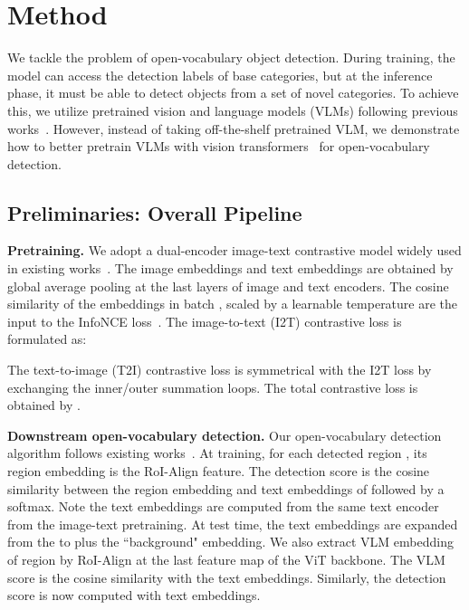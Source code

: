 \documentclass[10pt,twocolumn,letterpaper]{article}
\renewcommand{\paragraph}[1]{\vspace{1mm}\noindent\textbf{#1}}
\begin{document}
\section{Method}
\label{sec:method}

We tackle the problem of open-vocabulary object detection. During training, the model can access the detection labels of base categories, but at the inference phase, it must be able to detect objects from a set of novel categories. To achieve this, we utilize pretrained vision and language models (VLMs) following previous works~\cite{gu2022openvocabulary,zhong2021regionclip,kuo2022f}. However, instead of taking off-the-shelf pretrained VLM, we demonstrate how to better pretrain VLMs with vision transformers~\cite{dosovitskiy2020image} for open-vocabulary detection.

\subsection{Preliminaries: Overall Pipeline} 
\label{sec:preliminaries}
\paragraph{Pretraining.}\quad
We adopt a dual-encoder image-text contrastive model widely used in existing works~\cite{radford2021clip,align}. The image embeddings  and text embeddings  are obtained by global average pooling at the last layers of image and text encoders. The cosine similarity of the embeddings in batch , scaled by a learnable temperature  are the input to the InfoNCE loss~\cite{oord2018representation,radford2021clip}. The image-to-text (I2T) contrastive loss is formulated as:

The text-to-image (T2I) contrastive loss is symmetrical with the I2T loss by exchanging the inner/outer summation loops. The total contrastive loss  is obtained by .

\paragraph{Downstream open-vocabulary detection.}\quad
Our open-vocabulary detection algorithm follows existing works~\cite{Zareian_2021_CVPR,gu2022openvocabulary, kuo2022f, kim2023region}. At training, for each detected region , its region embedding is the RoI-Align feature. The detection score  is the cosine similarity between the region embedding and text embeddings of  followed by a softmax. Note the text embeddings are computed from the same text encoder from the image-text pretraining. At test time, the text embeddings are expanded from the  to  plus the ``background" embedding. We also extract VLM embedding of region  by RoI-Align at the last feature map of the ViT backbone. The VLM score  is the cosine similarity with the  text embeddings. Similarly, the detection score  is now computed with  text embeddings.
\end{document}
